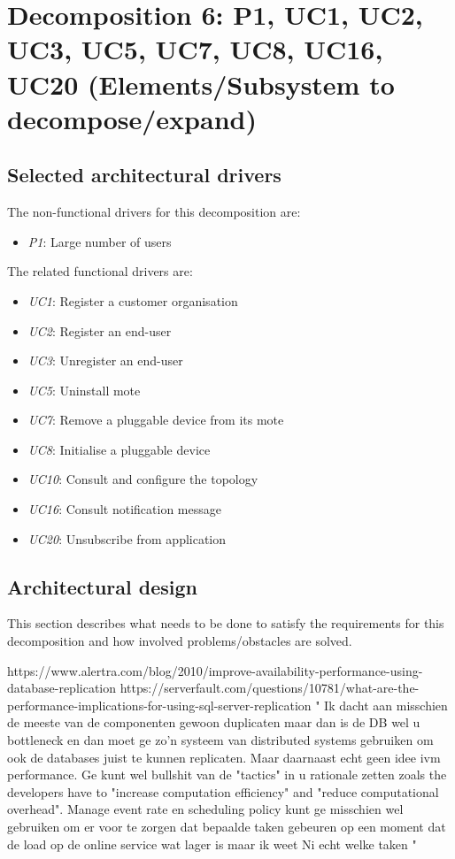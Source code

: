 \section{Decomposition 6: P1, UC1, UC2, UC3, UC5, UC7, UC8, UC16, UC20 (Elements/Subsystem to decompose/expand)}


\subsection{Selected architectural drivers}
    The non-functional drivers for this decomposition are:
    \begin{itemize}
    	\item \emph{P1}: Large number of users
    \end{itemize}

    The related functional drivers are:
    \begin{itemize}
        \item \emph{UC1}: Register a customer organisation
        \item \emph{UC2}: Register an end-user
        \item \emph{UC3}: Unregister an end-user
        \item \emph{UC5}: Uninstall mote
        \item \emph{UC7}: Remove a pluggable device from its mote
        \item \emph{UC8}: Initialise a pluggable device
        \item \emph{UC10}: Consult and configure the topology
        \item \emph{UC16}: Consult notification message
        \item \emph{UC20}: Unsubscribe from application
    \end{itemize}


\subsection{Architectural design}
    This section describes what needs to be done to satisfy the requirements for
    this decomposition and how involved problems/obstacles are solved.

    https://www.alertra.com/blog/2010/improve-availability-performance-using-database-replication
    https://serverfault.com/questions/10781/what-are-the-performance-implications-for-using-sql-server-replication
    "
    Ik dacht aan misschien de meeste van de componenten gewoon duplicaten maar dan is de DB wel u bottleneck en dan moet ge zo'n systeem van distributed systems gebruiken om ook de databases juist te kunnen replicaten.
    Maar daarnaast echt geen idee ivm performance. Ge kunt wel bullshit van de "tactics" in u rationale zetten zoals the developers have to "increase computation efficiency" and "reduce computational overhead".
    Manage event rate en scheduling policy kunt ge misschien wel gebruiken om er voor te zorgen dat bepaalde taken gebeuren op een moment dat de load op de online service wat lager is maar ik weet Ni echt welke taken
    "

